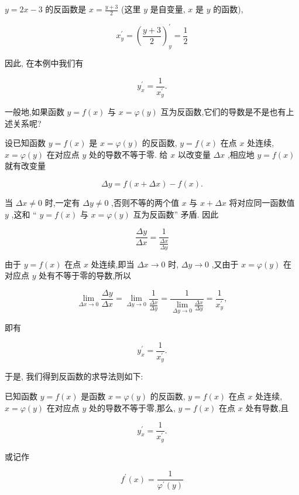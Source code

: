 \documentclass[lang=cn,newtx,10pt,scheme=chinese]{elegantbook}
\begin{document}
\(y = {2x} - 3\) 的反函数是 \(x = \frac{y + 3}{2}\) (这里 \(y\) 是自变量, \(x\) 是 \(y\) 的函数),

\[
{x}_{y}^{\prime } = {\left( \frac{y + 3}{2}\right) }_{y}^{\prime } = \frac{1}{2}
\]

因此, 在本例中我们有

\[
{y}_{x}^{\prime } = \frac{1}{{x}_{y}^{\prime }}.
\]

一般地,如果函数 \(y = f\left( x\right)\) 与 \(x = \varphi \left( y\right)\) 互为反函数,它们的导数是不是也有上述关系呢?

设已知函数 \(y = f\left( x\right)\) 是 \(x = \varphi \left( y\right)\) 的反函数, \(y = f\left( x\right)\) 在点 \(x\) 处连续, \(x = \varphi \left( y\right)\) 在对应点 \(y\) 处的导数不等于零. 给 \(x\) 以改变量 \({\Delta x}\) ,相应地 \(y = f\left( x\right)\) 就有改变量

\[
{\Delta y} = f\left( {x + {\Delta x}}\right) - f\left( x\right) .
\]

当 \({\Delta x} \neq 0\) 时,一定有 \({\Delta y} \neq 0\) ,否则不等的两个值 \(x\) 与 \(x + {\Delta x}\) 将对应同一函数值 \(y\) ,这和 “ \(y = f\left( x\right)\) 与 \(x = \varphi \left( y\right)\) 互为反函数” 矛盾. 因此

\[
\frac{\Delta y}{\Delta x} = \frac{1}{\frac{\Delta x}{\Delta y}}
\]

由于 \(y = f\left( x\right)\) 在点 \(x\) 处连续,即当 \({\Delta x} \rightarrow 0\) 时, \({\Delta y} \rightarrow 0\) ,又由于 \(x = \varphi \left( y\right)\) 在对应点 \(y\) 处有不等于零的导数,所以

\[
\mathop{\lim }\limits_{{{\Delta x} \rightarrow 0}}\frac{\Delta y}{\Delta x} = \mathop{\lim }\limits_{{{\Delta y} \rightarrow 0}}\frac{1}{\frac{\Delta x}{\Delta y}} = \frac{1}{\mathop{\lim }\limits_{{{\Delta y} \rightarrow 0}}\frac{\Delta x}{\Delta y}} = \frac{1}{{x}_{y}^{\prime }},
\]

即有

\[
{y}_{x}^{\prime } = \frac{1}{{x}_{y}^{\prime }}.
\]

于是, 我们得到反函数的求导法则如下:

已知函数 \(y = f\left( x\right)\) 是函数 \(x = \varphi \left( y\right)\) 的反函数, \(y = f\left( x\right)\) 在点 \(x\) 处连续, \(x = \varphi \left( y\right)\) 在对应点 \(y\) 处的导数不等于零,那么, \(y = f\left( x\right)\) 在点 \(x\) 处有导数,且

\[
{y}_{x}^{\prime } = \frac{1}{{x}_{y}^{\prime }}\text{.}
\]

或记作

\[
{f}^{\prime }\left( x\right) = \frac{1}{{\varphi }^{\prime }\left( y\right) }
\]
\end{document}
